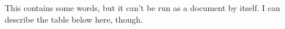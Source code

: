 This contains some words, but it can't be run as a document by itself. I can describe the table below here, though.